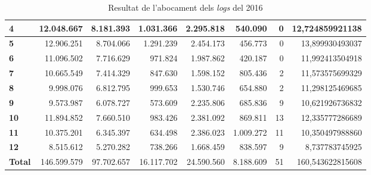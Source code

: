 \begin{table}[h!]
\begin{adjustbox}{width=1.5\textwidth, center}
\begin{tabular}{|l|r|r|r|r|r|r|r|}
            \textbf{4}     & 12.048.667  & 8.181.393  & 1.031.366  & 2.295.818  & 540.090   & 0  & 12,724859921138  \\
            \midrule
            \textbf{5}     & 12.906.251  & 8.704.066  & 1.291.239  & 2.454.173  & 456.773   & 0  & 13,899930493037  \\
            \textbf{6}     & 11.096.502  & 7.716.629  & 971.824    & 1.987.862  & 420.187   & 0  & 11,992413504918  \\
            \textbf{7}     & 10.665.549  & 7.414.329  & 847.630    & 1.598.152  & 805.436   & 2  & 11,573575699329  \\
            \textbf{8}     & 9.998.076   & 6.812.795  & 999.653    & 1.530.746  & 654.880   & 2  & 11,298125469685  \\
            \midrule
            \textbf{9}     & 9.573.987   & 6.078.727  & 573.609    & 2.235.806  & 685.836   & 9  & 10,621926736832  \\
            \textbf{10}    & 11.894.852  & 7.660.510  & 983.426    & 2.381.092  & 869.811   & 13 & 12,335777286689  \\
            \textbf{11}    & 10.375.201  & 6.345.397  & 634.498    & 2.386.023  & 1.009.272 & 11 & 10,350497988860  \\
            \textbf{12}    & 8.515.612   & 5.270.282  & 738.266    & 1.668.459  & 838.597   & 9  & 8,737783745925   \\
            \midrule
            \textbf{Total} & 146.599.579 & 97.702.657 & 16.117.702 & 24.590.560 & 8.188.609 & 51 & 160,543622815608 \\
            \bottomrule
        \end{tabular}
    \end{adjustbox}
    \caption{Resultat de l'abocament dels \textit{logs} del 2016}
    \label{tab:logs-table-2016}
\end{table}
